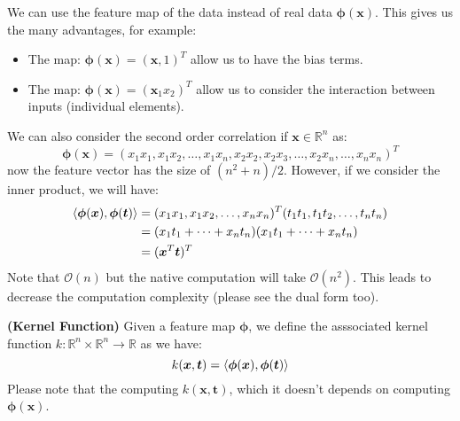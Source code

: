\begin{remark}
    We can use the feature map of the data instead of real data $\boldsymbol \phi(\boldsymbol x)$. This gives us the many advantages, for example:
    \begin{itemize}
        \item The map: $\boldsymbol \phi(\boldsymbol x) = (\boldsymbol x, 1)^T$ allow us to have the bias terms. 
        \item The map: $\boldsymbol \phi(\boldsymbol x) = (\boldsymbol x_1x_2)^T$ allow us to consider the interaction between inputs (individual elements). 
    \end{itemize}
    We can also consider the second order correlation if $\boldsymbol x\in \mathbb{R}^n$ as:
    \begin{equation*}
        \boldsymbol \phi(\boldsymbol x) = (x_1x_1,x_1x_2,\dots,x_1x_n,x_2x_2,x_2x_3,\dots,x_2x_n,\dots,x_nx_n)^T
    \end{equation*}
    now the feature vector has the size of $(n^2 + n)/2$. However, if we consider the inner product, we will have:
    \begin{equation*}
    \begin{aligned}
        \left\langle \boldsymbol \phi(\boldsymbol x), \boldsymbol \phi(\boldsymbol t) \right\rangle &= (x_1x_1,x_1x_2,\dots,x_nx_n)^T(t_1t_1,t_1t_2,\dots,t_nt_n) \\
        &= (x_1t_1+\cdots + x_nt_n) (x_1t_1+\cdots + x_nt_n) \\
        &= (\boldsymbol x^T\boldsymbol t)^T
    \end{aligned}
    \end{equation*}
    Note that $\mathcal{O}(n)$ but the native computation will take $\mathcal{O}(n^2)$.  This leads to decrease the computation complexity (please see the dual form too). 
\end{remark}

\begin{definition}{\textbf{(Kernel Function)}}
    Given a feature map $\boldsymbol \phi$, we define the asssociated kernel function $k : \mathbb{R}^n\times \mathbb{R}^n \rightarrow \mathbb{R}$ as we have:
    \begin{equation*}
        k(\boldsymbol x, \boldsymbol t) = \left\langle \boldsymbol \phi(\boldsymbol x), \boldsymbol \phi(\boldsymbol t) \right\rangle
    \end{equation*}
    Please note that the computing $k(\boldsymbol x, \boldsymbol t)$, which it doesn't depends on computing $\boldsymbol \phi(\boldsymbol x)$. 
\end{definition}

